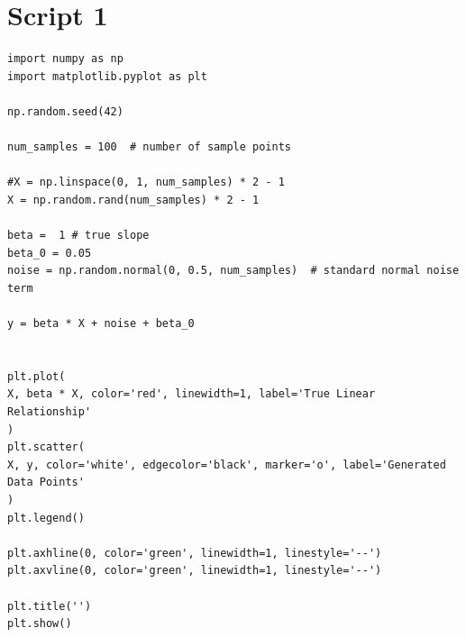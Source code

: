\documentclass[12pt,a4paper,oneside]{book} %
\begin{document}
	\section{Script 1}
	
\begin{mdframed}[linecolor=black, topline=true, bottomline=true,
	leftline=false, rightline=false, backgroundcolor=yellow!20!white]
\begin{verbatim}
import numpy as np
import matplotlib.pyplot as plt

np.random.seed(42)

num_samples = 100  # number of sample points

#X = np.linspace(0, 1, num_samples) * 2 - 1
X = np.random.rand(num_samples) * 2 - 1

beta =  1 # true slope
beta_0 = 0.05
noise = np.random.normal(0, 0.5, num_samples)  # standard normal noise term

y = beta * X + noise + beta_0


plt.plot(
X, beta * X, color='red', linewidth=1, label='True Linear Relationship'
)
plt.scatter(
X, y, color='white', edgecolor='black', marker='o', label='Generated Data Points'
)
plt.legend()

plt.axhline(0, color='green', linewidth=1, linestyle='--')
plt.axvline(0, color='green', linewidth=1, linestyle='--')

plt.title('')
plt.show()
	
\end{verbatim}
\end{mdframed}


%	
	
\end{document}
